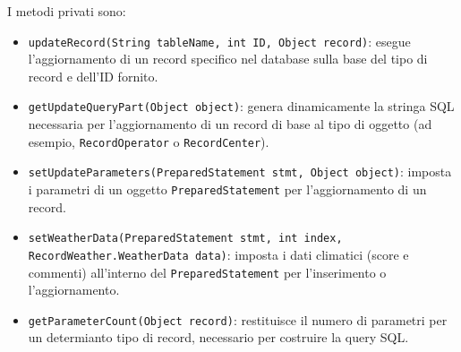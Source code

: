 I metodi privati sono:
\begin{itemize}
      \item \texttt{updateRecord(String tableName, int ID, Object record)}:
            esegue l'aggiornamento di un record specifico nel database sulla base del tipo di record e dell'ID fornito.
      \item \texttt{getUpdateQueryPart(Object object)}:
            genera dinamicamente la stringa SQL necessaria per l'aggiornamento di un record di base al tipo di oggetto (ad esempio, \texttt{RecordOperator} o \texttt{RecordCenter}).
      \item \texttt{setUpdateParameters(PreparedStatement stmt, Object object)}:
            imposta i parametri di un oggetto \texttt{PreparedStatement} per l'aggiornamento di un record.
      \item \texttt{setWeatherData(PreparedStatement stmt, int index, RecordWeather.WeatherData data)}:
            imposta i dati climatici (score e commenti) all'interno del \texttt{PreparedStatement} per l'inserimento o l'aggiornamento.
      \item \texttt{getParameterCount(Object record)}:
            restituisce il numero di parametri per un determianto tipo di record, necessario per costruire la query SQL.
\end{itemize}

